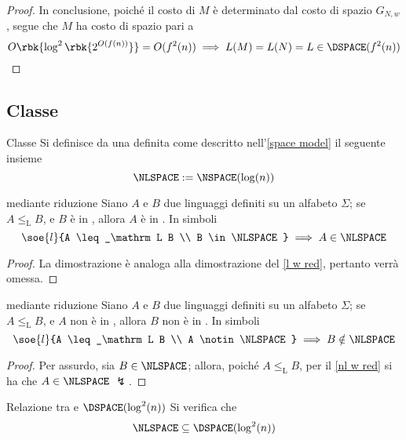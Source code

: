 \documentclass[a4paper, 12pt]{report}
\begin{document}
\begin{proof}
        In conclusione, poiché il costo di $M$ è determinato dal costo di spazio $G_{N, w}$, segue che $M$ ha costo di spazio pari a $$O \rbk{\log^2 \rbk{2^{O(f(n))}}} = O(f^2(n)) \implies L(M) = L(N) = L \in \DSPACE(f^2(n))$$
    \end{proof}

    \subsection{Classe \NLSPACE}

    \begin{frameddefn}{Classe \NLSPACE}
        Si definisce  da una \NTM definita come descritto nell'\cref{space model} il seguente insieme $$\NLSPACE := \NSPACE(\log(n))$$
    \end{frameddefn}
    
    \begin{framedthm}[label={nl w red}]{\NLSPACE mediante riduzione}
        Siano $A$ e $B$ due linguaggi definiti su un alfabeto $\Sigma$; se $A \leq_\mathrm L B$, e $B$ è in \NLSPACE, allora $A$ è in \NLSPACE. In simboli $$\soe{l}{A \leq_\mathrm L B \\ B \in \NLSPACE} \implies A \in \NLSPACE$$
    \end{framedthm}

    \begin{proof}
        La dimostrazione è analoga alla dimostrazione del \cref{l w red}, pertanto verrà omessa.
    \end{proof}

    \begin{framedcor}[label={nl w red cor}]{\NLSPACE mediante riduzione}
        Siano $A$ e $B$ due linguaggi definiti su un alfabeto $\Sigma$; se $A \leq_\mathrm L B$, e $A$ non è in \NLSPACE, allora $B$ non è in \NLSPACE. In simboli $$\soe{l}{A \leq_\mathrm L B \\ A \notin \NLSPACE} \implies B \notin \NLSPACE$$
    \end{framedcor}

    \begin{proof}
        Per assurdo, sia $B \in \NLSPACE$; allora, poiché $A \leq_\mathrm L B$, per il \cref{nl w red} si ha che $A \in \NLSPACE$ $\lightning$.
    \end{proof}

    \begin{framedprop}[label={nl in log sq}]{Relazione tra \NLSPACE e $\DSPACE(\log^2(n))$}
        Si verifica che $$\NLSPACE \subseteq \DSPACE(\log^2(n))$$
    \end{framedprop}
\end{document}
